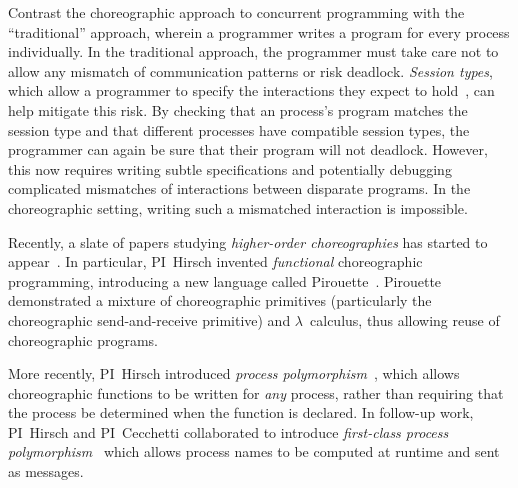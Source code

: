 Contrast the choreographic approach to concurrent programming with the ``traditional'' approach, wherein a programmer writes a program for every process individually.
In the traditional approach, the programmer must take care not to allow any mismatch of communication patterns or risk deadlock.
\emph{Session types}, which allow a programmer to specify the interactions they expect to hold~\cite{DeYoungCPT09,CairesP10,GayV10,Wadler12,ScalasY19}, can help mitigate this risk.
By checking that an process's program matches the session type and that different processes have compatible session types, the programmer can again be sure that their program will not deadlock.
However, this now requires writing subtle specifications and potentially debugging complicated mismatches of interactions between disparate programs.
In the choreographic setting, writing such a mismatched interaction is impossible.

Recently, a slate of papers studying \emph{higher-order choreographies} has started to appear~\cite{GraversenHM24,GiallorenzoMP23,CruzFilipeGLMP22,HirschG22,ShenKK23,SamuelsonHC25}.
In particular, PI~Hirsch invented \emph{functional} choreographic programming, introducing a new language called Pirouette~\cite{HirschG22}.
Pirouette demonstrated a mixture of choreographic primitives (particularly the choreographic send-and-receive primitive) and $\lambda$~calculus, thus allowing reuse of choreographic programs.

More recently, PI~Hirsch introduced \emph{process polymorphism}~\cite{GraversenHM24}, which allows choreographic functions to be written for \emph{any} process, rather than requiring that the process be determined when the function is declared.
In follow-up work, PI~Hirsch and PI~Cecchetti collaborated to introduce \emph{first-class process polymorphism}~\cite{SamuelsonHC25} which allows process names to be computed at runtime and sent as messages.

